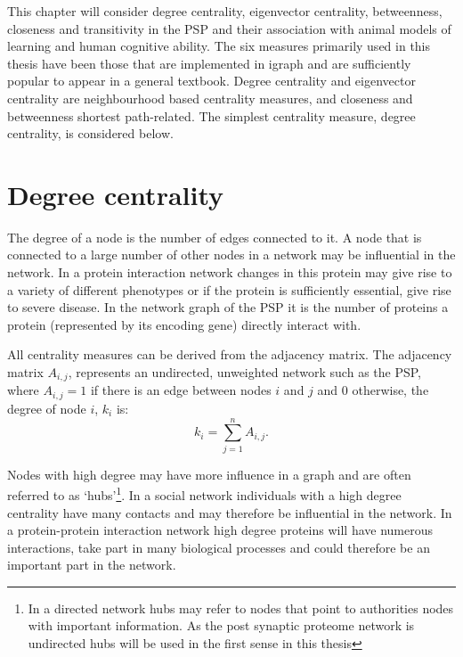 This chapter will consider degree centrality, eigenvector centrality, betweenness, closeness and transitivity in the PSP and their association with animal models of learning and human cognitive ability. The six measures primarily used in this thesis have been those that are implemented in igraph and are sufficiently popular to appear in a general textbook\cite{newman2018networks}. Degree centrality and eigenvector centrality are neighbourhood based centrality measures, and closeness and betweenness shortest path-related\cite{kardos2020stability}. The simplest centrality measure, degree centrality, \cite{newman2018networks} is considered below. 

\section{Degree centrality}
\label{sec:degree centrality}

The degree of a node is the number of edges connected to it. A node that is connected to a large number of other nodes in a network may be influential in the network. In a protein interaction network changes in this protein may give rise to a variety of different phenotypes or if the protein is sufficiently essential, give rise to severe disease.  In the network graph of the PSP it is the number of proteins a protein (represented by its encoding gene) directly interact with.


All centrality measures can be derived from the adjacency matrix. The adjacency matrix $A_{i,j}$, represents an undirected, unweighted network such as the PSP,  where $A_{i,j}=1$  if there is an edge between nodes $i$ and $j$ and 0 otherwise, the degree of node $i$, $k_i$ is\cite{boccaletti2006complex}:
\begin{equation}
k_i = \sum_{j=1}^n A_{i,j}.
\label{Equation:Degree_from_adjacency}
\end{equation}

 Nodes with high degree may have more influence in a graph and are often referred to as `hubs'\cite{zhu2007getting}\footnote{In a directed network hubs may refer to nodes that point to authorities nodes with important information. As the post synaptic proteome network is undirected hubs will be used in the first sense in this thesis\cite{kleinberg1999authoritative}}.  In a social network individuals with a high degree centrality have many contacts and may therefore be influential in the network. In a protein-protein interaction network high degree proteins will have numerous interactions, take part in many biological processes and could therefore be an important part in the network. 
 
